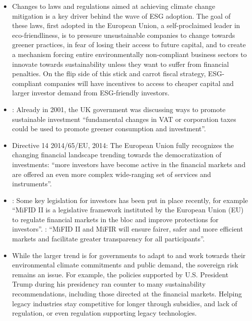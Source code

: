 \documentclass[
  letterpaper,
  DIV=11,
  numbers=noendperiod]{scrartcl}
\begin{document}
\begin{itemize}
\item
  \citet{pwc2022GrowthOpportunity2020} Changes to laws and regulations
  aimed at achieving climate change mitigation is a key driver behind
  the wave of ESG adoption. The goal of these laws, first adopted in the
  European Union, a self-proclaimed leader in eco-friendliness, is to
  pressure unsustainable companies to change towards greener practices,
  in fear of losing their access to future capital, and to create a
  mechanism forcing entire environmentally non-compliant business
  sectors to innovate towards sustainability unless they want to suffer
  from financial penalties. On the flip side of this stick and carrot
  fiscal strategy, ESG-compliant companies will have incentives to
  access to cheaper capital and larger investor demand from ESG-friendly
  investors.
\item
  \citet{houseofcommonsEnvironmentalAuditSecond2002}: Already in 2001,
  the UK government was discussing ways to promote sustainable
  investment ``fundamental changes in VAT or corporation taxes could be
  used to promote greener consumption and investment''.
\item
  \citet{europeanparliamentDirective2014652014} Directive 14 2014/65/EU,
  2014: The European Union fully recognizes the changing financial
  landscape trending towards the democratization of investments: ``more
  investors have become active in the financial markets and are offered
  an even more complex wide-ranging set of services and instruments''.
\item
  \citet{kentonMiFIDII2020}: Some key legislation for investors has been
  put in place recently, for example ``MiFID II is a legislative
  framework instituted by the European Union (EU) to regulate financial
  markets in the bloc and improve protections for investors''.
  \citet{europeansecuritiesandmarketsauthorityMiFIDII2017}: ``MiFID II
  and MiFIR will ensure fairer, safer and more efficient markets and
  facilitate greater transparency for all participants''.
\item
  \citet{quinsonTrumpPlanBlock2020} While the larger trend is for
  governments to adapt to and work towards their environmental climate
  commitments and public demand, the sovereign risk remains an issue.
  For example, the policies supported by U.S. President Trump during his
  presidency ran counter to many sustainability recommendations,
  including those directed at the financial markets. Helping legacy
  industries stay competitive for longer through subsidies, and lack of
  regulation, or even regulation supporting legacy technologies.
\end{itemize}
\end{document}
